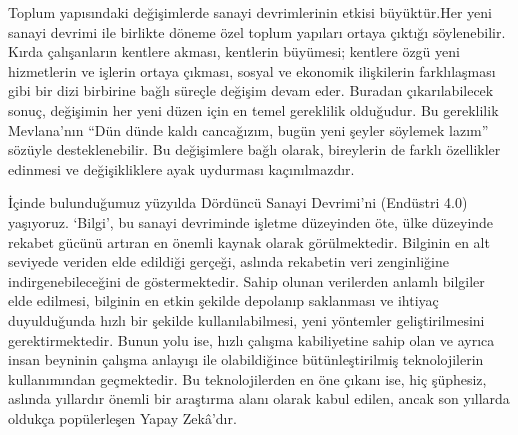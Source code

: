 \documentclass{article}
\begin{document}
\begin{multicols}{2}
Toplum yapısındaki değişimlerde sanayi devrimlerinin etkisi büyüktür.Her yeni sanayi devrimi ile birlikte döneme özel toplum yapıları ortaya çıktığı söylenebilir. Kırda çalışanların kentlere akması, kentlerin büyümesi; kentlere özgü yeni
hizmetlerin ve işlerin ortaya çıkması, sosyal ve ekonomik ilişkilerin farklılaşması
gibi bir dizi birbirine bağlı süreçle değişim devam eder. Buradan çıkarılabilecek
sonuç, değişimin her yeni düzen için en temel gereklilik olduğudur. Bu gereklilik Mevlana’nın “Dün dünde kaldı cancağızım, bugün yeni şeyler söylemek lazım” sözüyle desteklenebilir. Bu değişimlere bağlı olarak, bireylerin de farklı özellikler
edinmesi ve değişikliklere ayak uydurması kaçınılmazdır.
\vspace{10pt}

İçinde bulunduğumuz yüzyılda Dördüncü Sanayi Devrimi’ni (Endüstri 4.0) yaşıyoruz. ‘Bilgi’, bu sanayi devriminde işletme düzeyinden öte, ülke düzeyinde
rekabet gücünü artıran en önemli kaynak olarak görülmektedir. Bilginin en alt
seviyede veriden elde edildiği gerçeği, aslında rekabetin veri zenginliğine indirgenebileceğini de göstermektedir. Sahip olunan verilerden anlamlı bilgiler elde edilmesi, bilginin en etkin şekilde depolanıp saklanması ve ihtiyaç duyulduğunda hızlı bir şekilde kullanılabilmesi, yeni yöntemler geliştirilmesini gerektirmektedir. Bunun yolu ise, hızlı çalışma kabiliyetine sahip olan ve ayrıca
insan beyninin çalışma anlayışı ile olabildiğince bütünleştirilmiş teknolojilerin
kullanımından geçmektedir. Bu teknolojilerden en öne çıkanı ise, hiç şüphesiz,
aslında yıllardır önemli bir araştırma alanı olarak kabul edilen, ancak son yıllarda oldukça popülerleşen Yapay Zekâ’dır.


\end{multicols}
\end{document}
